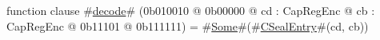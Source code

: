 function clause #\hyperref[sailMIPSzdecode]{decode}# (0b010010 @ 0b00000 @ cd : CapRegEnc @ cb : CapRegEnc @    0b11101 @ 0b111111) = #\hyperref[sailMIPSzSome]{Some}#(#\hyperref[sailMIPSzCSealEntry]{CSealEntry}#(cd, cb))
